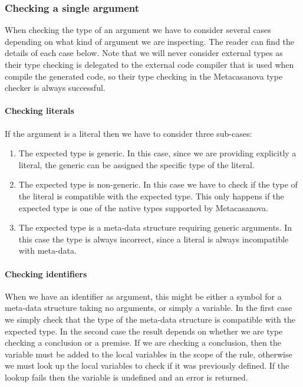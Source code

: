 \subsubsection{Checking a single argument}
\label{subsec:ch_metacasanova_argument_check}
When checking the type of an argument we have to consider several cases depending on what kind of argument we are inspecting. The reader can find the details of each case below. Note that we will never consider external types as their type checking is delegated to the external code compiler that is used when compile the generated code, so their type checking in the Metacasanova type checker is always successful.

\paragraph{Checking literals}
If the argument is a literal then we have to consider three sub-cases:

\begin{enumerate}
	\item The expected type is generic. In this case, since we are providing explicitly a literal, the generic can be assigned the specific type of the literal.
	\item The expected type is non-generic. In this case we have to check if the type of the literal is compatible with the expected type. This only happens if the expected type is one of the native types supported by Metacasanova.
	\item The expected type is a meta-data structure requiring generic arguments. In this case the type is always incorrect, since a literal is always incompatible with meta-data.
\end{enumerate}

\paragraph{Checking identifiers}
When we have an identifier as argument, this might be either a symbol for a meta-data structure taking no arguments, or simply a variable. In the first case we simply check that the type of the meta-data structure is compatible with the expected type. In the second case the result depends on whether we are type checking a conclusion or a premise. If we are checking a conclusion, then the variable must be added to the local variables in the scope of the rule, otherwise we must look up the local variables to check if it was previously defined. If the lookup fails then the variable is undefined and an error is returned.

